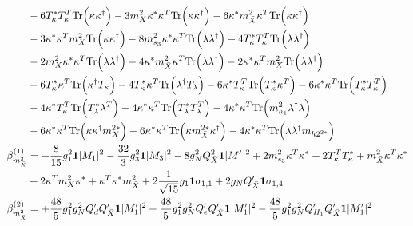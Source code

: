 {\begin{align}
 &-6 {T_{\kappa}^*  T_{\kappa}^{T}} \mbox{Tr}\Big({\kappa  \kappa^{\dagger}}\Big) -3 {m_{X}^2  \kappa^*  \kappa^{T}} \mbox{Tr}\Big({\kappa  \kappa^{\dagger}}\Big) -6 {\kappa^*  m_{\bar{X}}^2  \kappa^{T}} \mbox{Tr}\Big({\kappa  \kappa^{\dagger}}\Big) \nonumber \\ 
 &-3 {\kappa^*  \kappa^{T}  m_{X}^2} \mbox{Tr}\Big({\kappa  \kappa^{\dagger}}\Big) -8 m_{s_3}^2 {\kappa^*  \kappa^{T}} \mbox{Tr}\Big({\lambda  \lambda^{\dagger}}\Big) -4 {T_{\kappa}^*  T_{\kappa}^{T}} \mbox{Tr}\Big({\lambda  \lambda^{\dagger}}\Big) \nonumber \\ 
 &-2 {m_{X}^2  \kappa^*  \kappa^{T}} \mbox{Tr}\Big({\lambda  \lambda^{\dagger}}\Big) -4 {\kappa^*  m_{\bar{X}}^2  \kappa^{T}} \mbox{Tr}\Big({\lambda  \lambda^{\dagger}}\Big) -2 {\kappa^*  \kappa^{T}  m_{X}^2} \mbox{Tr}\Big({\lambda  \lambda^{\dagger}}\Big) \nonumber \\ 
 &-6 {T_{\kappa}^*  \kappa^{T}} \mbox{Tr}\Big({\kappa^{\dagger}  T_{\kappa}}\Big) -4 {T_{\kappa}^*  \kappa^{T}} \mbox{Tr}\Big({\lambda^{\dagger}  T_{\lambda}}\Big) -6 {\kappa^*  T_{\kappa}^{T}} \mbox{Tr}\Big({T_{\kappa}^*  \kappa^{T}}\Big) -6 {\kappa^*  \kappa^{T}} \mbox{Tr}\Big({T_{\kappa}^*  T_{\kappa}^{T}}\Big) \nonumber \\ 
 &-4 {\kappa^*  T_{\kappa}^{T}} \mbox{Tr}\Big({T_{\lambda}^*  \lambda^{T}}\Big) -4 {\kappa^*  \kappa^{T}} \mbox{Tr}\Big({T_{\lambda}^*  T_{\lambda}^{T}}\Big) -4 {\kappa^*  \kappa^{T}} \mbox{Tr}\Big({m_{h_1}^2  \lambda^{\dagger}  \lambda}\Big) \nonumber \\ 
 &-6 {\kappa^*  \kappa^{T}} \mbox{Tr}\Big({\kappa  \kappa^{\dagger}  m_{X}^{2 *}}\Big) -6 {\kappa^*  \kappa^{T}} \mbox{Tr}\Big({\kappa  m_{\bar{X}}^{2 *}  \kappa^{\dagger}}\Big) -4 {\kappa^*  \kappa^{T}} \mbox{Tr}\Big({\lambda  \lambda^{\dagger}  m_{{h 2}^{2 *}}}\Big) \\ 
\beta_{m_{\bar{X}}^2}^{(1)} & =  
-\frac{8}{15} g_{1}^{2} {\bf 1} |M_1|^2 -\frac{32}{3} g_{3}^{2} {\bf 1} |M_3|^2 -8 g_{N}^{2} Q_{\bar{X}}^{2} {\bf 1} |M_1'|^2 +2 m_{s_3}^2 {\kappa^{T}  \kappa^*} +2 {T_{\kappa}^{T}  T_{\kappa}^*} +{m_{\bar{X}}^2  \kappa^{T}  \kappa^*}\nonumber \\ 
 &+2 {\kappa^{T}  m_{X}^2  \kappa^*} +{\kappa^{T}  \kappa^*  m_{\bar{X}}^2}+2 \frac{1}{\sqrt{15}} g_1 {\bf 1} \sigma_{1,1} +2 g_N Q_{\bar{X}}' {\bf 1} \sigma_{1,4} \\ 
\beta_{m_{\bar{X}}^2}^{(2)} & =  
+\frac{48}{5} g_{1}^{2} g_{N}^{2} Q_d' Q_{\bar{X}}' {\bf 1} |M_1'|^2 +\frac{48}{5} g_{1}^{2} g_{N}^{2} Q_e' Q_{\bar{X}}' {\bf 1} |M_1'|^2 -\frac{48}{5} g_{1}^{2} g_{N}^{2} Q_{H_1}' Q_{\bar{X}}' {\bf 1} |M_1'|^2 \nonumber \\ 

\end{align}}

